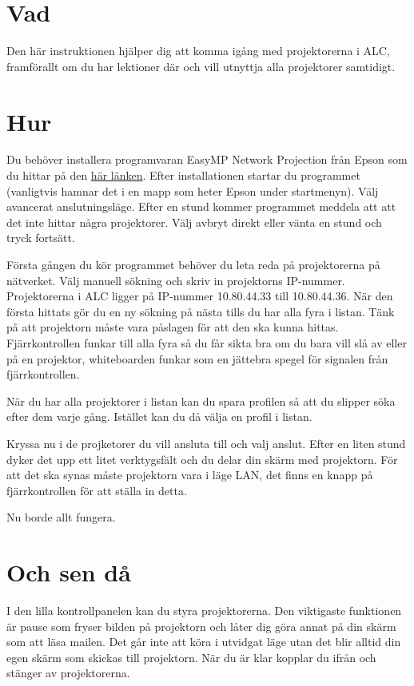 \documentclass[11pt]{article}
\begin{document}
\section{Vad}
    Den här instruktionen hjälper dig att komma igång med projektorerna i ALC, framförallt om du har lektioner där
    och vill utnyttja alla projektorer samtidigt.
\section{Hur}
    Du behöver installera programvaran EasyMP Network Projection från Epson som du hittar på den \href{https://ftp.epson.com/drivers/epson16189.exe}{här länken}.
    Efter installationen startar du programmet (vanligtvis hamnar det i en mapp som heter Epson under startmenyn). Välj avancerat anslutningsläge.
    Efter en stund kommer programmet meddela att att det inte hittar några projektorer. Välj avbryt direkt eller vänta en stund och tryck fortsätt.

    Första gången du kör programmet behöver du leta reda på projektorerna på nätverket. Välj manuell sökning och skriv in projektorns IP-nummer.
    Projektorerna i ALC ligger på IP-nummer 10.80.44.33 till 10.80.44.36. När den första hittats gör du en ny sökning på nästa tills du har alla fyra i listan.
    Tänk på att projektorn måste vara påslagen för att den ska kunna hittas. Fjärrkontrollen funkar till alla fyra så du får sikta
    bra om du bara vill slå av eller på en projektor, whiteboarden funkar som en jättebra spegel för signalen från fjärrkontrollen.

    När du har alla projektorer i listan kan du spara profilen så att du slipper söka efter dem varje gång. Istället kan du då välja en profil i listan.

    Kryssa nu i de projketorer du vill ansluta till och valj anslut. Efter en liten stund dyker det upp ett litet verktygsfält
    och du delar din skärm med projektorn. För att det ska synas måste projektorn vara i läge LAN, det finns en knapp på fjärrkontrollen för att ställa in detta.

    Nu borde allt fungera.
\section{Och sen då}
    I den lilla kontrollpanelen kan du styra projektorerna. Den viktigaste funktionen är pause som fryser bilden på projektorn och låter dig
    göra annat på din skärm som att läsa mailen. Det går inte att köra i utvidgat läge utan det blir alltid din egen skärm som skickas till projektorn.
    När du är klar kopplar du ifrån och stänger av projektorerna.
\end{document}
